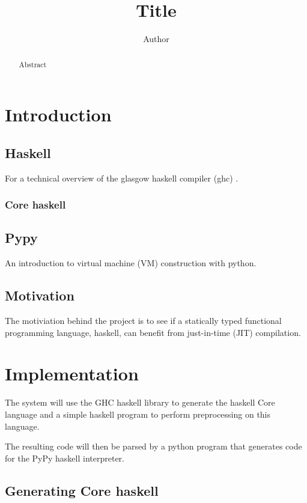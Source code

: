 \documentclass{article}
\begin{document}
\title{Title}
\author{Author}
\maketitle

\begin{abstract}
Abstract
\end{abstract}

\clearpage


\section{Introduction}

\subsection{Haskell}

For a technical overview of the glasgow haskell compiler (ghc) \cite{ghc}.

\subsubsection{Core haskell}

\subsection{Pypy}

An introduction to virtual machine (VM) construction with python\cite{pypy}.

\subsection{Motivation}

The motiviation behind the project is to see if a statically typed functional 
programming language, haskell, can benefit from just-in-time (JIT) compilation.

\section{Implementation}

The system will use the GHC haskell library to generate the haskell Core language
and a simple haskell program to perform preprocessing on this language.

The resulting code will then be parsed by a python program that generates code for the
PyPy haskell interpreter.

\subsection{Generating Core haskell}
\end{document}
